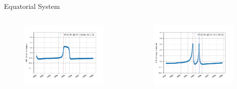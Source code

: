 \documentclass{beamer}
\begin{document}
\begin{frame}{Equatorial System}
\begin{columns}
	\hspace{-1cm}
	\begin{figure}									
		\includegraphics[width=1.25\textwidth]{Pics/EQ_LAT.png}
	\end{figure}
	\begin{figure}									
		\includegraphics[width=1.25\textwidth]{Pics/EQ_LONG.png}
	\end{figure}
\end{columns}
\end{frame}
\end{document}
